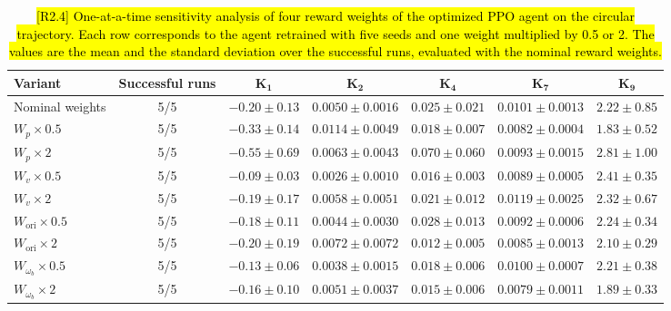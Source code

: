 \documentclass{ieeeaccess}
\newcommand{\hlone}[1]{{\sethlcolor{rone}\hl{#1}}}
\begin{document}
\begin{table}[t]
    \centering
    \caption{\hlone{[R2.4] One-at-a-time sensitivity analysis of four reward weights of the optimized PPO agent on the
    circular trajectory. Each row corresponds to the agent retrained with five seeds and one weight multiplied
    by 0.5 or 2. The values are the mean and the standard deviation over the successful runs, evaluated with
    the nominal reward weights.}}
    \label{tab:reward_sensitivity}
    \renewcommand{\arraystretch}{1.05}
    \setlength{\tabcolsep}{6pt}
    \small
    \begin{tabular}{lcccccc}
        \toprule
        \textbf{Variant} & \textbf{Successful runs} & $\boldsymbol{K_1}$ & $\boldsymbol{K_2}$ &
          $\boldsymbol{K_4}$ & $\boldsymbol{K_7}$ & $\boldsymbol{K_9}$ \\
        \midrule
        Nominal weights & 5/5 & $-0.20 \pm 0.13$ & $0.0050 \pm 0.0016$ & $0.025 \pm 0.021$ &
          $0.0101 \pm 0.0013$ & $2.22 \pm 0.85$ \\
        $W_p \times 0.5$ & 5/5 & $-0.33 \pm 0.14$ & $0.0114 \pm 0.0049$ & $0.018 \pm 0.007$ &
          $0.0082 \pm 0.0004$ & $1.83 \pm 0.52$ \\
        $W_p \times 2$ & 5/5 & $-0.55 \pm 0.69$ & $0.0063 \pm 0.0043$ & $0.070 \pm 0.060$ &
          $0.0093 \pm 0.0015$ & $2.81 \pm 1.00$ \\
        $W_v \times 0.5$ & 5/5 & $-0.09 \pm 0.03$ & $0.0026 \pm 0.0010$ & $0.016 \pm 0.003$ &
          $0.0089 \pm 0.0005$ & $2.41 \pm 0.35$ \\
        $W_v \times 2$ & 5/5 & $-0.19 \pm 0.17$ & $0.0058 \pm 0.0051$ & $0.021 \pm 0.012$ &
          $0.0119 \pm 0.0025$ & $2.32 \pm 0.67$ \\
        $W_{\mathrm{ori}} \times 0.5$ & 5/5 & $-0.18 \pm 0.11$ & $0.0044 \pm 0.0030$ & $0.028 \pm 0.013$ &
          $0.0092 \pm 0.0006$ & $2.24 \pm 0.34$ \\
        $W_{\mathrm{ori}} \times 2$ & 5/5 & $-0.20 \pm 0.19$ & $0.0072 \pm 0.0072$ & $0.012 \pm 0.005$ &
          $0.0085 \pm 0.0013$ & $2.10 \pm 0.29$ \\
        $W_{\omega_b} \times 0.5$ & 5/5 & $-0.13 \pm 0.06$ & $0.0038 \pm 0.0015$ & $0.018 \pm 0.006$ &
          $0.0100 \pm 0.0007$ & $2.21 \pm 0.38$ \\
        $W_{\omega_b} \times 2$ & 5/5 & $-0.16 \pm 0.10$ & $0.0051 \pm 0.0037$ & $0.015 \pm 0.006$ &
          $0.0079 \pm 0.0011$ & $1.89 \pm 0.33$ \\
        \bottomrule
    \end{tabular}
\end{table}
\end{document}
